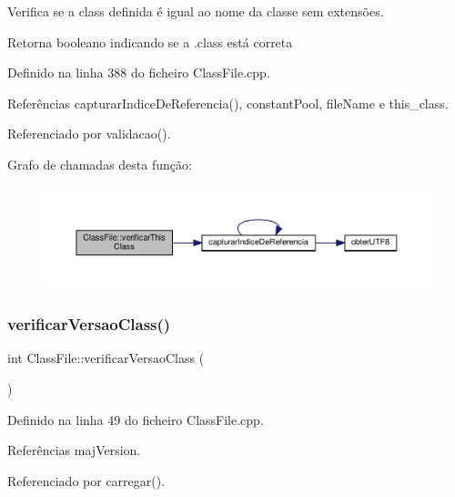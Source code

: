 Verifica se a class definida é igual ao nome da classe sem extensões. 

\begin{DoxyReturn}{Retorna}
booleano indicando se a .class está correta 
\end{DoxyReturn}


Definido na linha 388 do ficheiro Class\+File.\+cpp.



Referências capturar\+Indice\+De\+Referencia(), constant\+Pool, file\+Name e this\+\_\+class.



Referenciado por validacao().

Grafo de chamadas desta função\+:
\nopagebreak
\begin{figure}[H]
\begin{center}
\leavevmode
\includegraphics[width=350pt]{classClassFile_a6b8f23db0ee4af80a2e75d46a191dc20_cgraph}
\end{center}
\end{figure}
\mbox{\label{classClassFile_a423be12c855bb2f0479ff83823973da3}} 
\subsubsection{\texorpdfstring{verificar\+Versao\+Class()}{verificarVersaoClass()}}
{\footnotesize\ttfamily int Class\+File\+::verificar\+Versao\+Class (\begin{DoxyParamCaption}{ }\end{DoxyParamCaption})}



Definido na linha 49 do ficheiro Class\+File.\+cpp.



Referências maj\+Version.



Referenciado por carregar().



